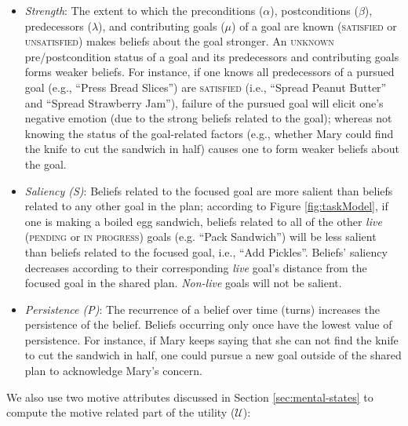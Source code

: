 \documentclass{sig-alternate-05-2015}
\begin{document}
\vspace*{-1mm}
\begin{itemize}[leftmargin=2pt]
  \setlength\itemsep{0.025mm}
  \item \textit{Strength}: The extent to which the preconditions ($\alpha$),
  postconditions ($\beta$), predecessors ($\lambda$), and contributing goals
  ($\mu$) of a goal are known (\textsc{satisfied} or \textsc{unsatisfied}) makes
  beliefs about the goal stronger. An \textsc{unknown} pre/postcondition status
  of a goal and its predecessors and contributing goals forms weaker beliefs.
  For instance, if one knows all predecessors of a pursued goal (e.g., ``Press
  Bread Slices'') are \textsc{satisfied} (i.e., ``Spread Peanut Butter'' and
  ``Spread Strawberry Jam''), failure of the pursued goal will elicit one's
  negative emotion (due to the strong beliefs related to the goal); whereas not
  knowing the status of the goal-related factors (e.g., whether Mary could find
  the knife to cut the sandwich in half) causes one to form weaker beliefs about
  the goal.
  \item \textit{Saliency (S)}: Beliefs related to the focused goal are more
  salient than beliefs related to any other goal in the plan; according to
  Figure \ref{fig:taskModel}, if one is making a boiled egg sandwich, beliefs
  related to all of the other \textit{live} (\textsc{pending} or \textsc{in
  progress}) goals (e.g. ``Pack Sandwich'') will be less salient than beliefs
  related to the focused goal, i.e., ``Add Pickles''. Beliefs' saliency
  decreases according to their corresponding \textit{live} goal's distance from
  the focused goal in the shared plan. \textit{Non-live} goals will not be
  salient.
  \item \textit{Persistence (P)}: The recurrence of a belief over time (turns)
  increases the persistence of the belief. Beliefs occurring only once have the
  lowest value of persistence. For instance, if Mary keeps saying that she can
  not find the knife to cut the sandwich in half, one could pursue a new goal
  outside of the shared plan to acknowledge Mary's concern.
\end{itemize}

\noindent We also use two motive attributes discussed in Section
\ref{sec:mental-states} to compute the motive related part of the utility
($\mathcal{U}$):
\end{document}
